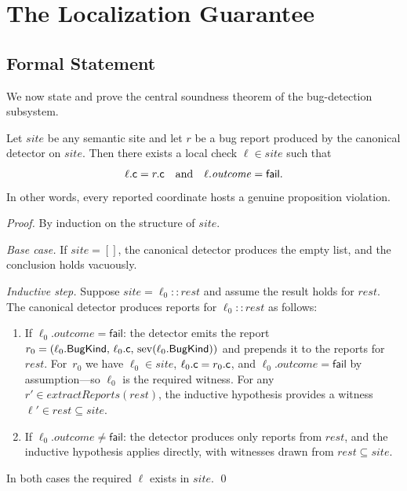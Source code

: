 \documentclass[11pt]{article}
\newcommand{\BugKind}{\ensuremath{\mathsf{BugKind}}}          %
\newcommand{\SevScore}{\mathrm{sev}}              %
\begin{document}
\section{The Localization Guarantee}\label{sec:theorem}

\subsection{Formal Statement}

We now state and prove the central soundness theorem of the bug-detection
subsystem.

\begin{theorem}\label{thm:localization}
Let $\mathit{site}$ be any semantic site and let $r$ be a bug report
produced by the canonical detector on $\mathit{site}$.  Then there
exists a local check $\ell \in \mathit{site}$ such that
\[
  \ell.\mathsf{c} = r.\mathsf{c}
  \quad\text{and}\quad
  \ell.\mathit{outcome} = \mathsf{fail}.
\]
In other words, every reported coordinate hosts a genuine proposition
violation.
\end{theorem}

\begin{proof}
By induction on the structure of $\mathit{site}$.

\medskip\noindent\textit{Base case.}
If $\mathit{site} = []$, the canonical detector produces the empty list,
and the conclusion holds vacuously.

\medskip\noindent\textit{Inductive step.}
Suppose $\mathit{site} = \ell_0 :: \mathit{rest}$ and assume the result
holds for $\mathit{rest}$.  The canonical detector produces reports for
$\ell_0 :: \mathit{rest}$ as follows:
\begin{enumerate}[leftmargin=2em,label=(\roman*)]
\item If $\ell_0.\mathit{outcome} = \mathsf{fail}$: the detector emits
  the report $r_0 = (\ell_0.\BugKind,\,\ell_0.\coord,\,
  \SevScore(\ell_0.\BugKind))$ and prepends it to the reports for
  $\mathit{rest}$.  For~$r_0$ we have
  $\ell_0 \in \mathit{site}$,
  $\ell_0.\mathsf{c} = r_0.\mathsf{c}$, and
  $\ell_0.\mathit{outcome} = \mathsf{fail}$ by assumption---so $\ell_0$
  is the required witness.  For any $r' \in \mathit{extractReports}(\mathit{rest})$,
  the inductive hypothesis provides a witness $\ell' \in \mathit{rest}
  \subseteq \mathit{site}$.
\item If $\ell_0.\mathit{outcome} \neq \mathsf{fail}$: the detector
  produces only reports from $\mathit{rest}$, and the inductive
  hypothesis applies directly, with witnesses drawn from $\mathit{rest}
  \subseteq \mathit{site}$.
\end{enumerate}
In both cases the required $\ell$ exists in $\mathit{site}$. \qed
\end{proof}
\end{document}
